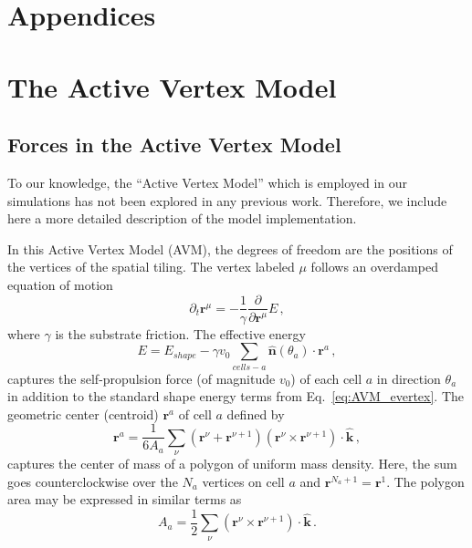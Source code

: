 \documentclass[
reprint
,aps
,amssymb
,amsmath
,superscriptaddress
]{revtex4-1}
\begin{document}

\section{Appendices}
\appendix
\section{The Active Vertex Model}
\subsection{Forces in the Active Vertex Model\label{app:avm_explained}}
To our knowledge, the ``Active Vertex Model'' which is employed in our simulations has not been explored in any previous work. Therefore, we include here a more detailed description of the model implementation. 

In this Active Vertex Model (AVM), the degrees of freedom are the positions of the vertices of the spatial tiling. The vertex labeled $\mu$ follows an overdamped equation of motion
%
\begin{equation}\label{eq:app_vert_dynamics}
\partial_t \mathbf{r}^\mu = -\frac{1}{\gamma} \frac{\partial}{\partial\mathbf{r}^\mu} E \, ,
\end{equation}
%
where $\gamma$ is the substrate friction. The effective energy
%
\begin{equation}\label{eq:app_total_energy}
E = E_{shape}  - \gamma v_0 \sum_{cells-a}\mathbf{\hat{n}}(\theta_a) \cdot \mathbf{r}^a\, ,
\end{equation}
%
captures the self-propulsion force (of magnitude $v_0$) of each cell $a$ in direction $\theta_a$ in addition to the standard shape energy terms from Eq.~\ref{eq:AVM_evertex}. The geometric center (centroid) $\mathbf{r}^a$ of cell $a$ defined by
%
\begin{equation}\label{eq:AVM_centroid}
\mathbf{r}^a = \frac{1}{6 A_a} \sum_{\nu} \left( \mathbf{r}^\nu  + \mathbf{r}^{\nu+1} \right) (\mathbf{r}^\nu  \times \mathbf{r}^{\nu+1}) \cdot \mathbf{\hat{k}} \, ,
\end{equation}
%
captures the center of mass of a polygon of uniform mass density. Here, the sum goes counterclockwise over the $N_a$ vertices on cell $a$ and $\mathbf{r}^{N_a + 1} = \mathbf{r}^{1}$. The polygon area may be expressed in similar terms as
%
\begin{equation}\label{eq:AVM_area_formula}
A_a = \frac{1}{2} \sum_{\nu} (\mathbf{r}^\nu  \times \mathbf{r}^{\nu+1}) \cdot \mathbf{\hat{k}} \, .
\end{equation}
%
\end{document}
